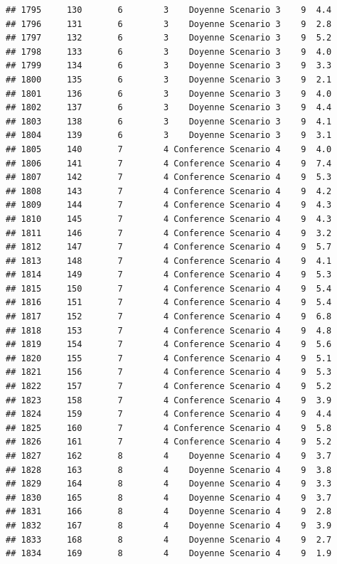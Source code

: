 \documentclass[
]{article}
\begin{document}
\begin{verbatim}
## 1795     130       6        3    Doyenne Scenario 3    9  4.4
## 1796     131       6        3    Doyenne Scenario 3    9  2.8
## 1797     132       6        3    Doyenne Scenario 3    9  5.2
## 1798     133       6        3    Doyenne Scenario 3    9  4.0
## 1799     134       6        3    Doyenne Scenario 3    9  3.3
## 1800     135       6        3    Doyenne Scenario 3    9  2.1
## 1801     136       6        3    Doyenne Scenario 3    9  4.0
## 1802     137       6        3    Doyenne Scenario 3    9  4.4
## 1803     138       6        3    Doyenne Scenario 3    9  4.1
## 1804     139       6        3    Doyenne Scenario 3    9  3.1
## 1805     140       7        4 Conference Scenario 4    9  4.0
## 1806     141       7        4 Conference Scenario 4    9  7.4
## 1807     142       7        4 Conference Scenario 4    9  5.3
## 1808     143       7        4 Conference Scenario 4    9  4.2
## 1809     144       7        4 Conference Scenario 4    9  4.3
## 1810     145       7        4 Conference Scenario 4    9  4.3
## 1811     146       7        4 Conference Scenario 4    9  3.2
## 1812     147       7        4 Conference Scenario 4    9  5.7
## 1813     148       7        4 Conference Scenario 4    9  4.1
## 1814     149       7        4 Conference Scenario 4    9  5.3
## 1815     150       7        4 Conference Scenario 4    9  5.4
## 1816     151       7        4 Conference Scenario 4    9  5.4
## 1817     152       7        4 Conference Scenario 4    9  6.8
## 1818     153       7        4 Conference Scenario 4    9  4.8
## 1819     154       7        4 Conference Scenario 4    9  5.6
## 1820     155       7        4 Conference Scenario 4    9  5.1
## 1821     156       7        4 Conference Scenario 4    9  5.3
## 1822     157       7        4 Conference Scenario 4    9  5.2
## 1823     158       7        4 Conference Scenario 4    9  3.9
## 1824     159       7        4 Conference Scenario 4    9  4.4
## 1825     160       7        4 Conference Scenario 4    9  5.8
## 1826     161       7        4 Conference Scenario 4    9  5.2
## 1827     162       8        4    Doyenne Scenario 4    9  3.7
## 1828     163       8        4    Doyenne Scenario 4    9  3.8
## 1829     164       8        4    Doyenne Scenario 4    9  3.3
## 1830     165       8        4    Doyenne Scenario 4    9  3.7
## 1831     166       8        4    Doyenne Scenario 4    9  2.8
## 1832     167       8        4    Doyenne Scenario 4    9  3.9
## 1833     168       8        4    Doyenne Scenario 4    9  2.7
## 1834     169       8        4    Doyenne Scenario 4    9  1.9

\end{verbatim}
\end{document}
